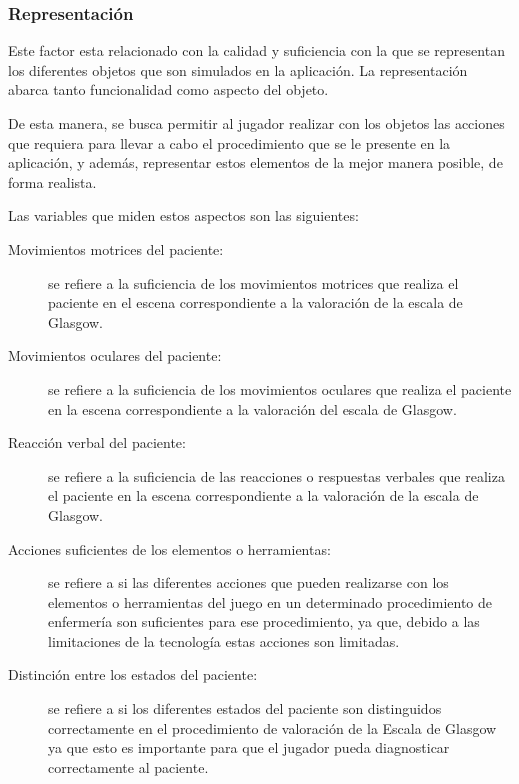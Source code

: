 \subsubsection{Representación}

Este factor esta relacionado con la calidad y suficiencia con la que se
representan los diferentes objetos que son simulados en la aplicación. La
representación abarca tanto funcionalidad como aspecto del objeto.

De esta manera, se busca permitir al jugador realizar con los objetos las
acciones que requiera para llevar a cabo el procedimiento que se le presente en
la aplicación, y además, representar estos elementos de la mejor manera posible,
de forma realista.

Las variables que miden estos aspectos son las siguientes:

\begin{description}

\item [Movimientos motrices del paciente:] se refiere a la suficiencia de los
    movimientos motrices que realiza el paciente en el escena correspondiente a
    la valoración de la escala de Glasgow.

\item [Movimientos oculares del paciente:] se refiere a la suficiencia de los
    movimientos oculares que realiza el paciente en la escena correspondiente a
    la valoración del escala de Glasgow.

\item [Reacción verbal del paciente:] se refiere a la suficiencia de las
    reacciones o respuestas verbales que realiza el paciente en la escena
    correspondiente a la valoración de la escala de Glasgow.

\item[Acciones suficientes de los elementos o herramientas:] se refiere a si las
    diferentes acciones que pueden realizarse con los elementos o herramientas
    del juego en un determinado procedimiento de enfermería son suficientes para
    ese procedimiento, ya que, debido a las limitaciones de la tecnología estas
    acciones son limitadas.

\item[Distinción entre los estados del paciente:] se refiere a si los diferentes
    estados del paciente son distinguidos correctamente en el procedimiento de
    valoración de la Escala de Glasgow ya que esto es importante para que el
    jugador pueda diagnosticar correctamente al paciente.

\end{description}

